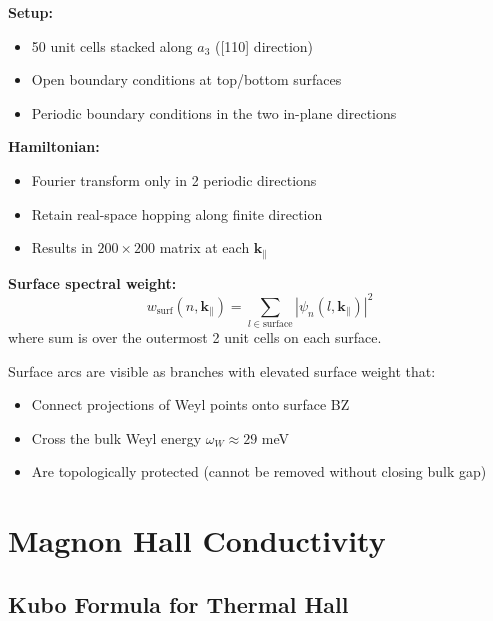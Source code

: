 \documentclass[11pt,letterpaper]{article}
\begin{document}
\begin{derivation}[title={Slab Construction}]
\textbf{Setup:}
\begin{itemize}
    \item 50 unit cells stacked along $a_3$ ([110] direction)
    \item Open boundary conditions at top/bottom surfaces
    \item Periodic boundary conditions in the two in-plane directions
\end{itemize}

\textbf{Hamiltonian:}
\begin{itemize}
    \item Fourier transform only in 2 periodic directions
    \item Retain real-space hopping along finite direction
    \item Results in $200 \times 200$ matrix at each $\bm{k}_\parallel$
\end{itemize}

\textbf{Surface spectral weight:}
\begin{equation}
w_{\text{surf}}(n, \bm{k}_\parallel) = \sum_{l \in \text{surface}} |\psi_n(l, \bm{k}_\parallel)|^2
\end{equation}
where sum is over the outermost 2 unit cells on each surface.
\end{derivation}

\begin{keyresult}[title={Surface Arc Detection}]
Surface arcs are visible as branches with elevated surface weight that:
\begin{itemize}
    \item Connect projections of Weyl points onto surface BZ
    \item Cross the bulk Weyl energy $\omega_W \approx 29$ meV
    \item Are topologically protected (cannot be removed without closing bulk gap)
\end{itemize}
\end{keyresult}

\section{Magnon Hall Conductivity}

\subsection{Kubo Formula for Thermal Hall}
\end{document}
